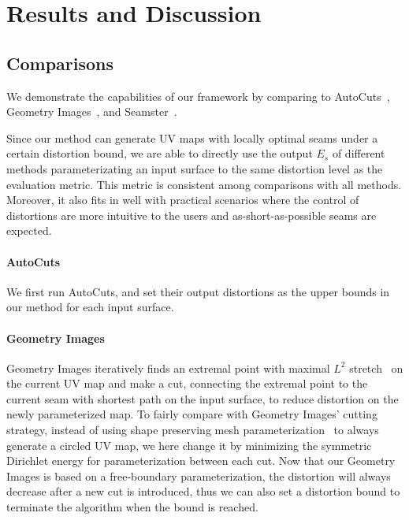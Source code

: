 
\section{Results and Discussion}
\label{sec:results}

\subsection{Comparisons}

We demonstrate the capabilities of our framework by comparing to AutoCuts~\cite{Poranne2017Autocuts}, Geometry Images~\cite{Gu2002Geometry}, and Seamster~\cite{Sheffer2002Seamster}.

Since our method can generate UV maps with locally optimal seams under a certain distortion bound, we are able to directly use the output $E_s$ of different methods parameterizating an input surface to the same distortion level as the evaluation metric. This metric is consistent among comparisons with all methods. Moreover, it also fits in well with practical scenarios where the control of distortions are more intuitive to the users and as-short-as-possible seams are expected.


\paragraph{AutoCuts}
We first run AutoCuts, and set their output distortions as the upper bounds in our method for each input surface.

\paragraph{Geometry Images}
Geometry Images iteratively finds an extremal point with maximal $L^2$ stretch~\cite{} on the current UV map and make a cut, connecting the extremal point to the current seam with shortest path on the input surface, to reduce distortion on the newly parameterized map. To fairly compare with Geometry Images' cutting strategy, instead of using shape preserving mesh parameterization~\cite{} to always generate a circled UV map, we here change it by minimizing the symmetric Dirichlet energy for parameterization between each cut. Now that our Geometry Images is based on a free-boundary parameterization, the distortion will always decrease after a new cut is introduced, thus we can also set a distortion bound to terminate the algorithm when the bound is reached.

